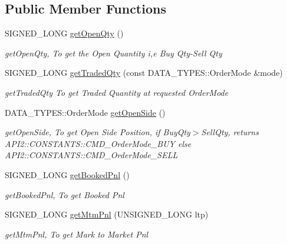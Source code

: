 \subsection*{Public Member Functions}
\begin{DoxyCompactItemize}
\item 
S\-I\-G\-N\-E\-D\-\_\-\-L\-O\-N\-G \hyperlink{struct_a_p_i2_1_1_c_o_m_m_o_n_1_1_instrument_position_a6bd5cf326e5317a97e5bb940e7639059}{get\-Open\-Qty} ()
\begin{DoxyCompactList}\small\item\em get\-Open\-Qty, To get the Open Quantity i,e Buy Qty-\/\-Sell Qty \end{DoxyCompactList}\item 
S\-I\-G\-N\-E\-D\-\_\-\-L\-O\-N\-G \hyperlink{struct_a_p_i2_1_1_c_o_m_m_o_n_1_1_instrument_position_a061e14d8ea0f660c3e742c2b306a0323}{get\-Traded\-Qty} (const D\-A\-T\-A\-\_\-\-T\-Y\-P\-E\-S\-::\-Order\-Mode \&mode)
\begin{DoxyCompactList}\small\item\em get\-Traded\-Qty To get Traded Quantity at requested Order\-Mode \end{DoxyCompactList}\item 
D\-A\-T\-A\-\_\-\-T\-Y\-P\-E\-S\-::\-Order\-Mode \hyperlink{struct_a_p_i2_1_1_c_o_m_m_o_n_1_1_instrument_position_a4b437e372244c4a85e8407535907ac78}{get\-Open\-Side} ()
\begin{DoxyCompactList}\small\item\em get\-Open\-Side, To get Open Side Position, if Buy\-Qty$>$Sell\-Qty, returns A\-P\-I2\-::\-C\-O\-N\-S\-T\-A\-N\-T\-S\-::\-C\-M\-D\-\_\-\-Order\-Mode\-\_\-\-B\-U\-Y else A\-P\-I2\-::\-C\-O\-N\-S\-T\-A\-N\-T\-S\-::\-C\-M\-D\-\_\-\-Order\-Mode\-\_\-\-S\-E\-L\-L \end{DoxyCompactList}\item 
S\-I\-G\-N\-E\-D\-\_\-\-L\-O\-N\-G \hyperlink{struct_a_p_i2_1_1_c_o_m_m_o_n_1_1_instrument_position_a5c6d74ae6c4d08deb1d9670bbb615044}{get\-Booked\-Pnl} ()
\begin{DoxyCompactList}\small\item\em get\-Booked\-Pnl, To get Booked Pnl \end{DoxyCompactList}\item 
S\-I\-G\-N\-E\-D\-\_\-\-L\-O\-N\-G \hyperlink{struct_a_p_i2_1_1_c_o_m_m_o_n_1_1_instrument_position_a29f4a14b3b1e6d9e7bdcd38b6b4ec2f8}{get\-Mtm\-Pnl} (U\-N\-S\-I\-G\-N\-E\-D\-\_\-\-L\-O\-N\-G ltp)
\begin{DoxyCompactList}\small\item\em get\-Mtm\-Pnl, To get Mark to Market Pnl \end{DoxyCompactList}\item 

\end{DoxyCompactItemize}
